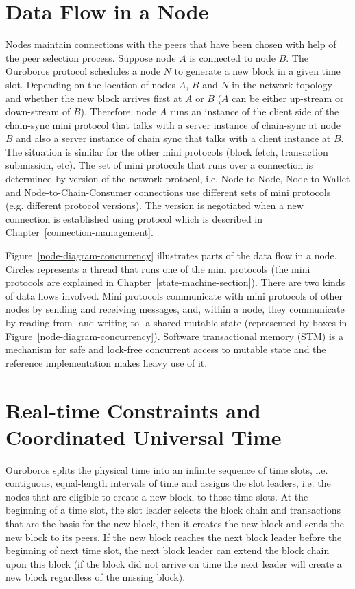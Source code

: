 \documentclass{report}
\theoremstyle{definition}{
  \newtheorem{lemma}{Lemma}[section] %
  \newtheorem{definition}[lemma]{Definition}
}
\theoremstyle{theorem}{
  \newtheorem{invariant}[lemma]{Invariant}
  \newtheorem{proofobligation}[lemma]{Proof Obligation}
}
\numberwithin{equation}{lemma}
\begin{document}
\section{Data Flow in a Node}
Nodes maintain connections with the peers that have been chosen with help of the peer selection process.
Suppose node $A$ is connected to node $B$.
The Ouroboros protocol schedules a node $N$ to generate a new block in a given time slot.
Depending on the location of nodes $A$, $B$ and $N$ in the network topology and whether the new
block arrives first at $A$ or $B$ ($A$ can be either up-stream or down-stream of $B$).
Therefore, node $A$ runs an instance of the client side of the chain-sync mini protocol
that talks with a server instance of chain-sync at node $B$ and also a server instance of chain sync
that talks with a client instance at $B$.
The situation is similar for the other mini protocols (block fetch, transaction submission, etc).
The set of mini protocols that runs over a connection is determined by version of the network
protocol, i.e.  Node-to-Node, Node-to-Wallet and Node-to-Chain-Consumer
connections use different sets of mini protocols (e.g. different protocol
versions).  The version is negotiated when a new connection is established
using protocol which is described in Chapter~\ref{connection-management}.

Figure~\ref{node-diagram-concurrency} illustrates parts of the data flow in a node.
Circles represents a thread that runs one of the mini protocols (the mini protocols are explained in
Chapter~\ref{state-machine-section}).
There are two kinds of data flows involved.
Mini protocols communicate with mini protocols of other nodes by sending and receiving messages,
and, within a node, they communicate by reading from- and writing to- a shared
mutable state (represented by boxes in Figure~\ref{node-diagram-concurrency}).
\href{https://en.wikipedia.org/wiki/Software_transactional_memory}{Software transactional memory} (STM) is a mechanism for safe and lock-free concurrent
access to mutable state and the reference implementation makes heavy use of it.

\section{Real-time Constraints and Coordinated Universal Time}
Ouroboros splits the physical time into an infinite sequence of time slots,
i.e. contiguous, equal-length intervals of time
and assigns the slot leaders, i.e. the nodes that are eligible to create a new block, to those time slots.
At the beginning of a time slot, the slot leader selects the block chain and transactions that are the basis
for the new block, then it creates the new block and sends the new block to its peers.
If the new block reaches the next block leader before the beginning of next time slot,
the next block leader can extend the block chain upon this block (if the block
did not arrive on time the next leader will create a new block regardless of
the missing block).
\end{document}
